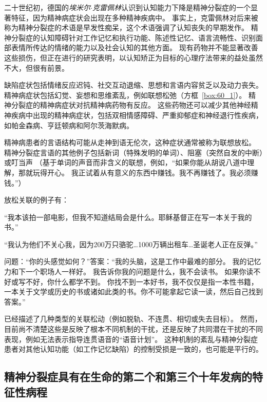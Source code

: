 二十世纪初，德国的\textit{埃米尔$\cdot$克雷佩林}认识到认知能力下降是精神分裂症的一个显著特征，因为精神病症状会出现在多种精神疾病中。
事实上，克雷佩林对后来被称为精神分裂症的术语是早发性痴呆，这个术语强调了认知丧失的早期发作。
精神分裂症的认知障碍针对工作记忆和执行功能、陈述性记忆、语言流畅性、识别面部表情所传达的情绪的能力以及社会认知的其他方面。
现有药物并不能显著改善这些损伤，但正在进行的研究表明，以认知矫正为目标的心理疗法带来的益处虽然不大，但很有前景。


缺陷症状包括情绪反应迟钝、社交互动退缩、思想和言语内容贫乏以及动力丧失。
精神病症状包括幻觉、妄想和思维紊乱，例如联想松弛（方框~\ref{box:60_1}）。
精神分裂症的精神病症状对抗精神病药物有反应。
这些药物还可以减少其他神经精神疾病中出现的精神病症状，包括双相情感障碍、严重抑郁症和神经退行性疾病，如帕金森病、亨廷顿病和阿尔茨海默病。


\begin{proposition}[思维障碍] \label{box:60_1}
	
	\quad \quad 精神病患者的言语结构可能从走神到语无伦次，这种症状通常被称为联想放松。
	精神分裂症言语的其他例子包括新词（特殊发明的单词）、阻塞（突然自发的中断）或叮当声
	（基于单词的声音而非含义的联想，例如，“如果你能从胡说八道中理解，那就玩得开心。
	我正试着从有意义的东西中赚钱。我不再赚钱了。我必须赚钱。”）
	
	放松关联的例子有：
	
	“我本该拍一部电影，但我不知道结局会是什么。耶稣基督正在写一本关于我的书。”
	
	“我认为他们不关心我，因为200万只骆驼…1000万辆出租车…圣诞老人正在反弹。”
	
	问题：“你的头感觉如何？”答案：“我的头脑，这是工作中最难的部分。
	我的记忆力和下一个职场人一样好。
	我告诉你我的问题是什么，我不会读书。
	如果你读不好或写不好，你什么都学不到。
	你找不到一本好书，我不仅仅是指一本性书籍，一本关于文学或历史的书或诸如此类的书。你不可能拿起它读一读，然后自己找到答案。”
	
	已经描述了几种类型的关联松动（例如脱轨、不连贯、相切或失去目标）。
	然而，目前尚不清楚这些是反映了根本不同机制的干扰，还是反映了共同潜在干扰的不同表现，例如无法表示指导连贯语音的“语音计划”。
	这种机制的紊乱与精神分裂症患者对其他认知功能（如工作记忆缺陷）的控制受损是一致的，也可能是平行的。

\end{proposition}




\subsection{精神分裂症具有在生命的第二个和第三个十年发病的特征性病程}

